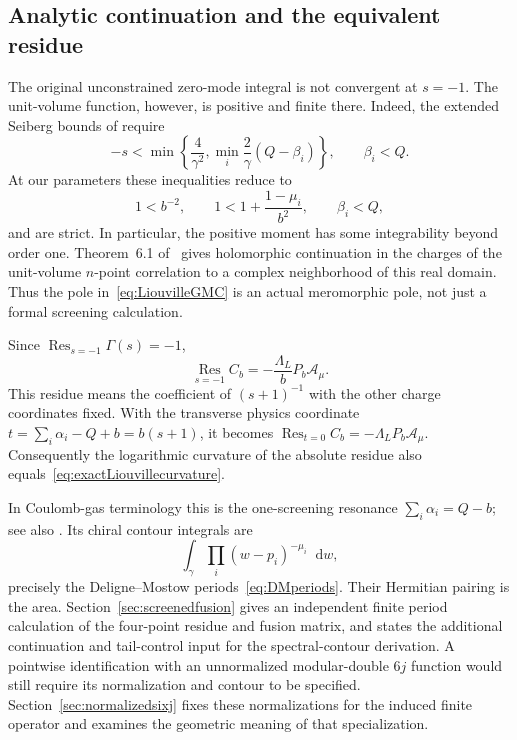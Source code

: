 \documentclass[11pt,a4paper]{article}
\numberwithin{equation}{section}
\theoremstyle{definition}
\theoremstyle{remark}
\newcommand{\dd}{\mathop{}\!\mathrm d}
\begin{document}
\subsection{Analytic continuation and the equivalent residue}

The original unconstrained zero-mode integral is not convergent
at $s=-1$. The unit-volume function, however, is positive and
finite there. Indeed, the extended Seiberg bounds of
\cite[eq.~(2.14)]{KRV} require
\[
 -s<\min\left\{\frac4{\gamma^2},
       \min_i\frac2\gamma(Q-\beta_i)\right\},\qquad \beta_i<Q.
\]
At our parameters these inequalities reduce to
\begin{equation}
 1<b^{-2},\qquad
 1<1+\frac{1-\mu_i}{b^2},\qquad \beta_i<Q,
 \label{eq:flatSeibergbounds}
\end{equation}
and are strict. In particular, the positive moment has some
integrability beyond order one. Theorem~6.1 of~\cite{KRV}
gives holomorphic continuation in the charges of the unit-volume
$n$-point correlation to a complex neighborhood of this real
domain. Thus the pole in~\eqref{eq:LiouvilleGMC} is an actual
meromorphic pole, not just a formal screening calculation.

Since $\operatorname{Res}_{s=-1}\Gamma(s)=-1$,
\begin{equation}
 \operatorname*{Res}_{s=-1}C_b
      =-\frac{\Lambda_L}{b}P_b\mathcal A_\mu.
 \label{eq:onescreeningresidue}
\end{equation}
This residue means the coefficient of $(s+1)^{-1}$ with the
other charge coordinates fixed. With the transverse physics
coordinate $t=\sum_i\alpha_i-Q+b=b(s+1)$, it becomes
$\operatorname{Res}_{t=0}C_b=-\Lambda_LP_b\mathcal A_\mu$.
Consequently the logarithmic curvature of the absolute residue
also equals~\eqref{eq:exactLiouvillecurvature}.

In Coulomb-gas terminology this is the one-screening resonance
$\sum_i\alpha_i=Q-b$; see also
\cite[Section~3.4]{TeschnerRevisited}. Its chiral contour integrals are
\begin{equation}
 \int_\gamma\prod_i(w-p_i)^{-\mu_i}\dd w,
 \label{eq:screeningDMperiods}
\end{equation}
precisely the Deligne--Mostow periods~\eqref{eq:DMperiods}.
Their Hermitian pairing is the area. Section~\ref{sec:screenedfusion}
gives an independent finite period calculation of the four-point
residue and fusion matrix, and states the additional continuation
and tail-control input for the spectral-contour derivation. A pointwise
identification with an unnormalized modular-double $6j$ function
would still require its normalization and contour to be specified.
Section~\ref{sec:normalizedsixj} fixes these normalizations
for the induced finite operator and examines the geometric
meaning of that specialization.
\end{document}

